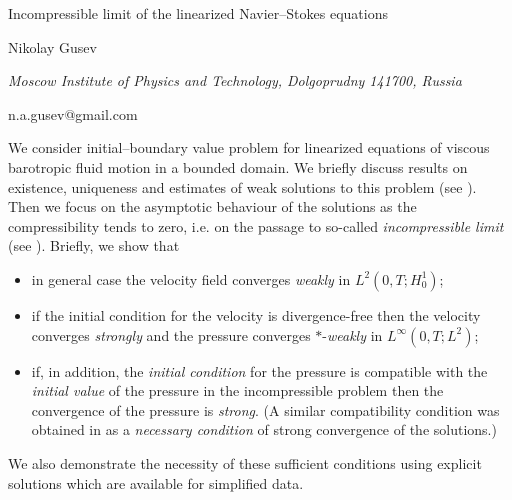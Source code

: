 \documentclass[10pt,a4paper]{article}
\begin{document}
\begin{center}

{\Large Incompressible limit of the linearized Navier--Stokes equations}

\bigskip

{\sc Nikolay Gusev}

{\small\it Moscow Institute of Physics and Technology, Dolgoprudny 141700, Russia}

{\small\rm n.a.gusev@gmail.com}

\end{center}

\bigskip

We consider initial--boundary value problem for linearized equations of viscous
barotropic fluid motion in a bounded domain. We briefly discuss results on
existence, uniqueness and estimates of weak solutions to this problem
(see \cite{IKM,MZ02,G11}).
Then we focus on the asymptotic behaviour of the solutions as the 
compressibility tends to zero, i.e. on the passage to so-called
\emph{incompressible limit} (see \cite{LM98,FN07}).
Briefly, we show that
\begin{itemize}
\item in general case the velocity field converges \emph{weakly} in $L^2(0,T;H_0^1)$;
\item if the initial condition for the velocity is divergence-free
then the velocity converges \emph{strongly} and the pressure
converges $*$-\emph{weakly} in $L^\infty(0,T;L^2)$;
\item if, in addition, the \emph{initial condition} for the pressure
is compatible with the \emph{initial value} of the pressure
in the incompressible problem then the convergence of
the pressure is \emph{strong}. (A similar compatibility condition
was obtained in \cite{Sh99} as a \emph{necessary condition} of strong
convergence of the solutions.)
\end{itemize}
We also demonstrate the necessity of these sufficient conditions using
explicit solutions which are available for simplified data.
\end{document}
